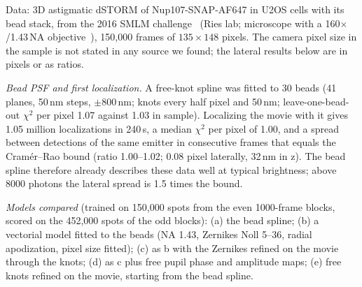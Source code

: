 \documentclass[11pt,a4paper]{article}
\begin{document}
Data: 3D astigmatic dSTORM of Nup107-SNAP-AF647 in U2OS cells with its bead stack, from the 2016 SMLM
challenge~\cite{challenge} (Ries lab; microscope with a 160$\times$/1.43\,NA objective~\cite{cspline}),
150{,}000 frames of $135\times148$ pixels. The camera pixel size in the sample is not stated in any source we
found; the lateral results below are in pixels or as ratios.

\emph{Bead PSF and first localization.} A free-knot spline was fitted to 30 beads (41 planes, 50\,nm steps,
$\pm800$\,nm; knots every half pixel and 50\,nm; leave-one-bead-out $\chi^2$ per pixel 1.07 against 1.03 in
sample). Localizing the movie with it gives 1.05 million localizations in 240\,s, a median $\chi^2$ per pixel
of 1.00, and a spread between detections of the same emitter in consecutive frames that equals the
Cram\'er--Rao bound (ratio 1.00--1.02; 0.08 pixel laterally, 32\,nm in z). The bead spline therefore already
describes these data well at typical brightness; above 8000 photons the lateral spread is 1.5 times the bound.

\emph{Models compared} (trained on 150{,}000 spots from the even 1000-frame blocks, scored on the 452{,}000
spots of the odd blocks): (a) the bead spline; (b) a vectorial model fitted to the beads (NA 1.43, Zernikes
Noll 5--36, radial apodization, pixel size fitted); (c) as b with the Zernikes refined on the movie through the
knots; (d) as c plus free pupil phase and amplitude maps; (e) free knots refined on the movie, starting from
the bead spline.
\end{document}
